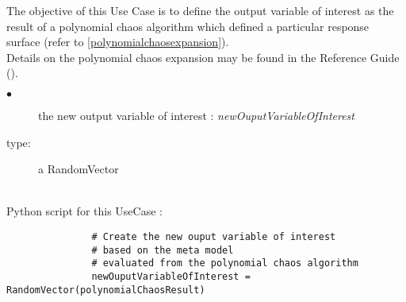 \renewcommand{\filename}{docUC_OVI_PolyChaosExp.tex}
\renewcommand{\filetitle}{UC : Creation of the output variable of interest from the result of a polynomial chaos expansion}

\HeaderIIILevel


\label{RandomVectorPolynomialChaos}




The objective of this Use Case is to define the output variable of interest as the result of a polynomial chaos algorithm which defined a particular response surface (refer to \ref{polynomialchaosexpansion}).\\

Details on the polynomial chaos expansion may be found in the Reference Guide ().\\


             {
               \begin{description}
               \item[$\bullet$] the new output variable of interest : {\itshape newOuputVariableOfInterest}
               \item[type:] a RandomVector
               \end{description}
             }

             \textspace\\
             Python script for this UseCase :

             \begin{lstlisting}
               # Create the new ouput variable of interest
               # based on the meta model
               # evaluated from the polynomial chaos algorithm
               newOuputVariableOfInterest = RandomVector(polynomialChaosResult)
             \end{lstlisting}
